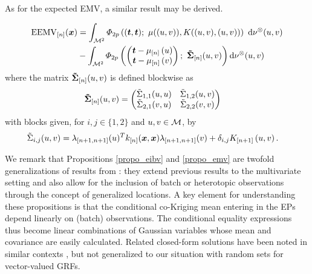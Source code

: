 \documentclass[aoas]{imsart}
\begin{document}
As for the expected EMV, a similar result may be derived.
\begin{propo}
\label{propo_emv}

\begin{equation*}
\begin{split}
\currentEEMV(\bm{x})
&=\int_{\domain^2} 
\varPhi_{2\no}
\left(
(\bt, \bt); ~ \mu((u,v)), 
K((u,v),(u,v))
\right) 
\
\mathrm{d}\mes^{\otimes} %
(u,v)\\
&-\int_{\domain^2} \varPhi_{2\no}
\left(
\left(
\begin{matrix}
\bt-\currentMean{\uu}\\
\bt-\currentMean{\vv}
\end{matrix}
\right);~
\mathbf{\tilde{\Sigma}}_{[\stage]}(\uu, \vv)
\right)
\mathrm{d}\mes^{\otimes} %
(u,v)
\end{split}
\end{equation*}
where the matrix $\mathbf{\tilde{\Sigma}}_{[n]}(u, v)$ is defined blockwise as
\begin{equation*}
\begin{split}
\mathbf{\tilde{\Sigma}}_{[n]}(\uu, \vv)&=
\left(
\begin{matrix}
\tilde{\Sigma}_{1,1}(\uu, \uu) & \tilde{\Sigma}_{1,2}(\uu, \vv)\\
\tilde{\Sigma}_{2,1}(\vv, \uu) & \tilde{\Sigma}_{2,2}(\vv, \vv)
\end{matrix}\right)
\end{split}
\end{equation*}
with blocks given, for $i,j\in \{1,2\}$ and $u,v\in \mathcal{M}$, by
\begin{equation*}
\begin{split}
\tilde{\Sigma}_{i,j}(u, v) &= \lambda_{[n+1,n+1]}(\uu)^T k_{[n]}(\bm{x},\bm{x}) \lambda_{[n+1,n+1]}(\vv) + \delta_{i,j}\futureCov{\uu, \vv}.
\end{split}
\end{equation*}
\end{propo}

We remark that Propositions \ref{propo_eibv} and \ref{propo_emv} are
twofold generalizations of results from \cite{chevalier2014fast}: they
extend previous results to the multivariate setting and also allow for
the inclusion of batch or heterotopic observations through the concept
of generalized locations.  A key element for understanding these
propositions is that the conditional co-Kriging mean entering in the
EPs depend linearly on (batch) observations. The conditional equality
expressions thus become linear combinations of Gaussian variables
whose mean and covariance are easily calculated.  Related closed-form
solutions have been noted in similar contexts
\citep{bhattacharjya2013value,stroh}, but not generalized to our
situation with random sets for vector-valued GRFs.
\end{document}
